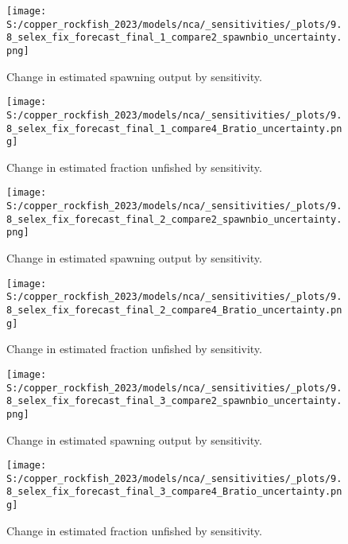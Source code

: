 \documentclass[11pt,
  english,
  letterpaper,
]{article}
\begin{document}
\newpage

\begin{figure}
\centering
\texttt{[image: S:/copper\_rockfish\_2023/models/nca/\_sensitivities/\_plots/9.8\_selex\_fix\_forecast\_final\_1\_compare2\_spawnbio\_uncertainty.png]}
\caption{Change in estimated spawning output by sensitivity.\label{fig:sens-ssb-1}}
\end{figure}

\newpage

\begin{figure}
\centering
\texttt{[image: S:/copper\_rockfish\_2023/models/nca/\_sensitivities/\_plots/9.8\_selex\_fix\_forecast\_final\_1\_compare4\_Bratio\_uncertainty.png]}
\caption{Change in estimated fraction unfished by sensitivity.\label{fig:sens-depl-1}}
\end{figure}

\newpage

\begin{figure}
\centering
\texttt{[image: S:/copper\_rockfish\_2023/models/nca/\_sensitivities/\_plots/9.8\_selex\_fix\_forecast\_final\_2\_compare2\_spawnbio\_uncertainty.png]}
\caption{Change in estimated spawning output by sensitivity.\label{fig:sens-ssb-2}}
\end{figure}

\newpage

\begin{figure}
\centering
\texttt{[image: S:/copper\_rockfish\_2023/models/nca/\_sensitivities/\_plots/9.8\_selex\_fix\_forecast\_final\_2\_compare4\_Bratio\_uncertainty.png]}
\caption{Change in estimated fraction unfished by sensitivity.\label{fig:sens-depl-2}}
\end{figure}

\newpage

\begin{figure}
\centering
\texttt{[image: S:/copper\_rockfish\_2023/models/nca/\_sensitivities/\_plots/9.8\_selex\_fix\_forecast\_final\_3\_compare2\_spawnbio\_uncertainty.png]}
\caption{Change in estimated spawning output by sensitivity.\label{fig:sens-ssb-3}}
\end{figure}

\newpage

\begin{figure}
\centering
\texttt{[image: S:/copper\_rockfish\_2023/models/nca/\_sensitivities/\_plots/9.8\_selex\_fix\_forecast\_final\_3\_compare4\_Bratio\_uncertainty.png]}
\caption{Change in estimated fraction unfished by sensitivity.\label{fig:sens-depl-3}}
\end{figure}
\end{document}
